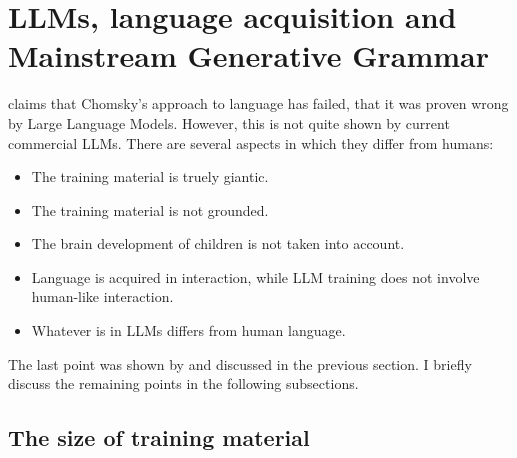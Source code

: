 \section{LLMs, language acquisition and Mainstream Generative Grammar}
\label{sec-LLMs-and-language-acquisition}


\citet{Piantadosi2024a} claims that Chomsky's
approach to language has failed, that it was proven wrong by Large Language Models. However, this is
not quite shown by current commercial LLMs. There are several aspects in which they differ from
humans:
\begin{itemize}
\item The training material is truely giantic.
\item The training material is not grounded.
\item The brain development of children is not taken into account.
\item Language is acquired in interaction, while LLM training does not involve human-like interaction.
\item Whatever is in LLMs differs from human language.
\end{itemize}
%
The last point was shown by \citet{Webelhuth2026a} and discussed in the previous section. I briefly
discuss the remaining points in the following subsections.

\subsection{The size of training material}

